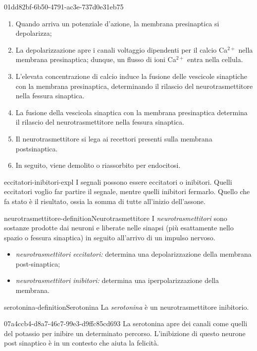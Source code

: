 \documentclass[preview]{standalone}
\begin{document}
\begin{snippet}{01dd82bf-6b50-4791-ac3e-737d0e31eb75}
    \begin{enumerate}
        \item Quando arriva un potenziale d'azione, la membrana presinaptica si depolarizza;
        \item La depolarizzazione apre i canali voltaggio dipendenti per il calcio Ca\({}^{2+}\) nella membrana
            presinaptica; dunque, un flusso di ioni Ca\({}^{2+}\) entra nella cellula.
        \item L'elevata concentrazione di calcio induce la fusione delle vescicole sinaptiche con la
            membrana presinaptica, determinando il rilascio del neurotrasmettitore nella fessura
            sinaptica.
        \item La fusione della vescicola sinaptica con la membrana presinaptica determina il rilascio del
        neurotrasmettitore nella fessura sinaptica.
        \item Il neurotrasmettitore si lega ai recettori presenti sulla membrana postsinaptica.
        \item In seguito, viene demolito o riassorbito per endocitosi.
    \end{enumerate}
\end{snippet}

\begin{snippet}{eccitatori-inibitori-expl}
    I segnali possono essere eccitatori o inibitori.
Quelli eccitatori voglio far partire il segnale, mentre quelli inibitori
fermarlo. Quello che fa stato è il risultato, ossia la somma di tutte
all'inizio dell'assone.
\end{snippet}

\begin{snippetdefinition}{neurotrasmettitore-definition}{Neurotrasmettitore}
    I \textit{neurotrasmettitori} sono sostanze prodotte dai neuroni e liberate nelle sinapsi (più
    esattamente nello spazio o fessura sinaptica) in seguito all'arrivo di un impulso nervoso.
    \begin{itemize}
        \item \textit{neurotrasmettitori eccitatori:} determina una depolarizzazione della membrana post-sinaptica;
        \item \textit{neurotrasmettitori inibitori:} determina una iperpolarizzazione della membrana.
    \end{itemize}
\end{snippetdefinition}

\begin{snippetdefinition}{serotonina-definition}{Serotonina}
    La \textit{serotonina} è un neurotrasmettitore inibitorio.
\end{snippetdefinition}

\begin{snippet}{07a4ccb4-d8a7-46c7-99e3-d9ffc85cd693}
    La serotonina apre dei canali come quelli del potassio per inibire un determinato percorso.
L'inibizione di questo neurone post sinaptico è in un contesto che aiuta la felicità.
\end{snippet}
\end{document}
